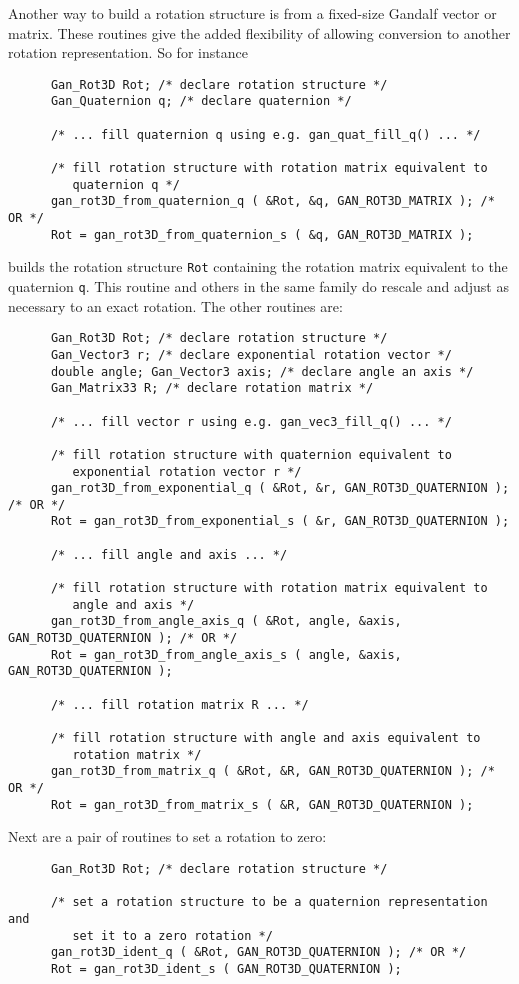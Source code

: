 Another way to build a rotation structure is from a fixed-size Gandalf vector
or matrix. These routines give the added flexibility of allowing conversion
to another rotation representation. So for instance
\begin{verbatim}
      Gan_Rot3D Rot; /* declare rotation structure */
      Gan_Quaternion q; /* declare quaternion */

      /* ... fill quaternion q using e.g. gan_quat_fill_q() ... */

      /* fill rotation structure with rotation matrix equivalent to
         quaternion q */
      gan_rot3D_from_quaternion_q ( &Rot, &q, GAN_ROT3D_MATRIX ); /* OR */
      Rot = gan_rot3D_from_quaternion_s ( &q, GAN_ROT3D_MATRIX );
\end{verbatim}
builds the rotation structure {\tt Rot} containing the rotation matrix
equivalent to the quaternion {\tt q}. This routine and others in the same
family do rescale and adjust as necessary to an exact rotation.
The other routines are:
\begin{verbatim}
      Gan_Rot3D Rot; /* declare rotation structure */
      Gan_Vector3 r; /* declare exponential rotation vector */
      double angle; Gan_Vector3 axis; /* declare angle an axis */
      Gan_Matrix33 R; /* declare rotation matrix */

      /* ... fill vector r using e.g. gan_vec3_fill_q() ... */

      /* fill rotation structure with quaternion equivalent to
         exponential rotation vector r */
      gan_rot3D_from_exponential_q ( &Rot, &r, GAN_ROT3D_QUATERNION ); /* OR */
      Rot = gan_rot3D_from_exponential_s ( &r, GAN_ROT3D_QUATERNION );

      /* ... fill angle and axis ... */

      /* fill rotation structure with rotation matrix equivalent to
         angle and axis */
      gan_rot3D_from_angle_axis_q ( &Rot, angle, &axis, GAN_ROT3D_QUATERNION ); /* OR */
      Rot = gan_rot3D_from_angle_axis_s ( angle, &axis, GAN_ROT3D_QUATERNION );

      /* ... fill rotation matrix R ... */

      /* fill rotation structure with angle and axis equivalent to
         rotation matrix */
      gan_rot3D_from_matrix_q ( &Rot, &R, GAN_ROT3D_QUATERNION ); /* OR */
      Rot = gan_rot3D_from_matrix_s ( &R, GAN_ROT3D_QUATERNION );
\end{verbatim}

Next are a pair of routines to set a rotation to zero:
\begin{verbatim}
      Gan_Rot3D Rot; /* declare rotation structure */

      /* set a rotation structure to be a quaternion representation and
         set it to a zero rotation */
      gan_rot3D_ident_q ( &Rot, GAN_ROT3D_QUATERNION ); /* OR */
      Rot = gan_rot3D_ident_s ( GAN_ROT3D_QUATERNION );
\end{verbatim}

